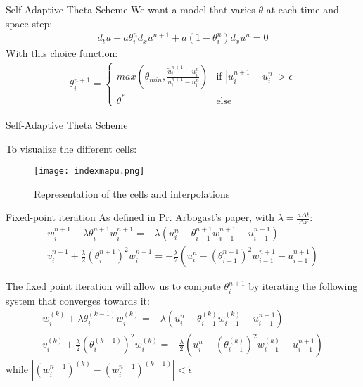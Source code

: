 \documentclass[10pt]{beamer}
\begin{document}
\begin{frame}{Self-Adaptive Theta Scheme}
    We want a model that varies $\theta$ at each time and space step:
    \begin{align*}
        d_t u + a\theta_i^n d_x u^{n+1} + a(1-\theta_i^n) d_x u^n = 0 
    \end{align*}
    With this choice function:
    \begin{align*}
        \theta_i^{n+1} = \begin{cases}
            max(\theta_{min}, \frac{\tilde{u}_i^{n+1} - u_i^n}{u_i^{n+1} - u_i^n} ) & \text{if } |u_i^{n+1} - u_i^n| > \epsilon \\
            \theta^* & \text{else} 
        \end{cases}
    \end{align*}

\end{frame}

\begin{frame}{Self-Adaptive Theta Scheme}

    To visualize the different cells:
    \begin{figure}[H]
        \centering
        \texttt{[image: indexmapu.png]}
        \caption{Representation of the cells and interpolations}
    \end{figure}
    
\end{frame}

\begin{frame}{Fixed-point iteration}
    As defined in Pr. Arbogast's paper, with $\lambda = \frac{a \Delta t}{\Delta x}$:
    \begin{align*}
        w_i^{n+1} + \lambda \theta_i^{n+1} w_i^{n+1} = -\lambda(u_i^n - \theta_{i-1}^{n+1} w_{i-1}^{n+1} - u_{i-1}^{n+1}) \\
        v_i^{n+1} + \frac{\lambda}{2} (\theta_i^{n+1})^2 w_i^{n+1} = -\frac{\lambda}{2} (u_i^n - (\theta_{i-1}^{n+1})^2 w_{i-1}^{n+1} - u_{i-1}^{n+1})
    \end{align*}
    
    The fixed point iteration will allow us to compute $\theta_i^{n+1}$ by iterating the following system that converges towards it:
    \begin{align*}
        w_i^{(k)} + \lambda \theta_i^{(k-1)} w_i^{(k)} = -\lambda(u_i^n - \theta_{i-1}^{(k)} w_{i-1}^{(k)} - u_{i-1}^{n+1})\\
        v_i^{(k)} + \frac{\lambda}{2} (\theta_i^{(k-1)})^2 w_i^{(k)} = -\frac{\lambda}{2} (u_i^n - (\theta_{i-1}^{(k)})^2 w_{i-1}^{(k)} - u_{i-1}^{n+1}) 
    \end{align*}
    while $|(w_i^{n+1})^{(k)} - (w_i^{n+1})^{(k-1)}| < \tilde{\epsilon}$
\end{frame}
\end{document}
